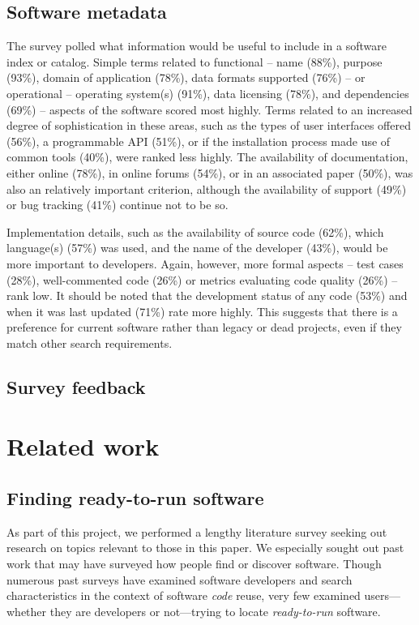 \documentclass{casicswhitepaper}
\begin{document}
\subsection{Software metadata}

The survey polled what information would be useful to include in a software index or catalog. Simple terms related to functional -- name (88\%), purpose (93\%), domain of application (78\%), data formats supported (76\%) -- or operational -- operating system(s) (91\%), data licensing (78\%), and dependencies (69\%) -- aspects of the software scored most highly. Terms related to an increased degree of sophistication in these areas, such as the types of user interfaces offered (56\%), a programmable API (51\%), or if the installation process made use of common tools (40\%), were ranked less highly. 
The availability of documentation, either online (78\%), in online forums (54\%), or in an associated paper (50\%), was also an relatively important criterion, although the availability of support (49\%) or bug tracking (41\%) continue not to be so. 

Implementation details, such as the availability of source code (62\%), which language(s) (57\%) was used, and the name of the developer (43\%), would be more important to developers. Again, however, more formal aspects -- test cases (28\%), well-commented code (26\%) or metrics evaluating code quality (26\%) -- rank low. It should be noted that the development status of any code (53\%) and when it was last updated (71\%) rate more highly. This suggests that there is a preference for current software rather than legacy or dead projects, even if they match other search requirements.


\subsection{Survey feedback}


\section{Related work}

\subsection{Finding ready-to-run software}

As part of this project, we performed a lengthy literature survey seeking out research on topics relevant to those in this paper.  We especially sought out past work that may have surveyed how people find or discover software.  Though numerous past surveys have examined software developers and search characteristics in the context of software \emph{code} reuse, very few examined users---whether they are developers or not---trying to locate \emph{ready-to-run} software.
\end{document}
